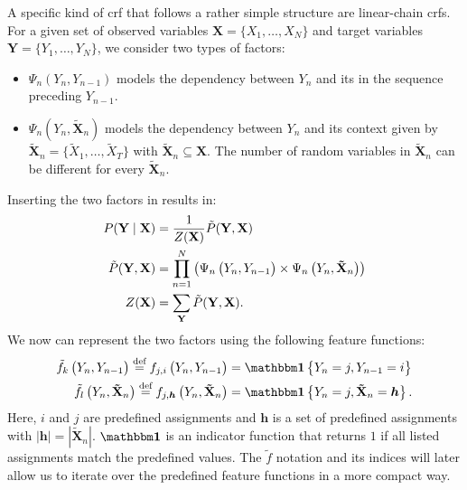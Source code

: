 A specific kind of \gls{crf} that follows a rather simple structure are \glspl{linear-chain crf}.
For a given set of \glspl{observed variable} $\mathbf{X}=\{X_1,\dots,X_N\}$ and \glspl{target variable} $\mathbf{Y}=\{Y_1,\dots,Y_N\}$, we consider two types of \glspl{factor}:
\begin{itemize}
  \item $\Psi_n(Y_n,Y_{n-1})$ models the dependency between $Y_n$ and its in the sequence preceding $Y_{n-1}$.
  \item $\Psi_n(Y_n,\mathbf{\tilde{X}}_n)$ models the dependency between $Y_n$ and its context given by $\mathbf{\tilde{X}}_n=\{\tilde{X}_1,\dots,\tilde{X}_T\}$ with $\mathbf{\tilde{X}}_n\subseteq\mathbf{X}$.
    The number of \glspl{random variable} in $\tilde{\mathbf{X}}_n$ can be different for every $\mathbf{\tilde{X}}_n$.
\end{itemize}
Inserting the two factors in  results in:
\begin{equation}
  \label{equ:linear-chain-crf-factor}
  \begin{split}
    P(\mathbf{Y}\mid\mathbf{X}) & = \frac{1}{Z(\mathbf{X})}\tilde{P}(\mathbf{Y},\mathbf{X}) \\
    \tilde{P}(\mathbf{Y},\mathbf{X}) &= \prod_{n=1}^{N}\left(\Psi_n\left(\vphantom{\tilde{X}}Y_n,Y_{n-1}\right)\times\Psi_n\left(Y_n,\mathbf{\tilde{X}}_n\right)\right) \\
    Z(\mathbf{X}) & = \sum_{\mathbf{Y}}\tilde{P}(\mathbf{Y},\mathbf{X}).
  \end{split}
\end{equation}
We now can represent the two \glspl{factor} using the following \glspl{feature function}:
\begin{equation}
  \label{equ:linear-chain-crf-feature-functions}
  \begin{split}
    \tilde{f}_k\left(\vphantom{\tilde{X}}Y_n,Y_{n-1}\right)\equalsdef f_{j,i}\left(\vphantom{\tilde{X}}Y_n,Y_{n-1}\right) & = \identityfun\left\{\vphantom{\tilde{X}}Y_n=j,Y_{n-1}=i\right\}\\
    \tilde{f}_l\left(Y_n,\mathbf{\tilde{X}}_n\right)\equalsdef f_{j,\bm{h}}\left( Y_n,\mathbf{\tilde{X}}_n\right) & = \identityfun\left\{Y_n=j,\mathbf{\tilde{X}}_n=\bm{h}\right\}.
  \end{split}
\end{equation}
Here, $i$ and $j$ are predefined \glspl{assignment} and $\bm{h}$ is a set of predefined \glspl{assignment} with $|\bm{h}|=|\mathbf{\tilde{X}}_n|$. $\identityfun$ is an indicator function that returns $1$ if all listed assignments match the predefined values.
The $\tilde{f}$ notation and its indices will later allow us to iterate over the predefined \glspl{feature function} in a more compact way.

